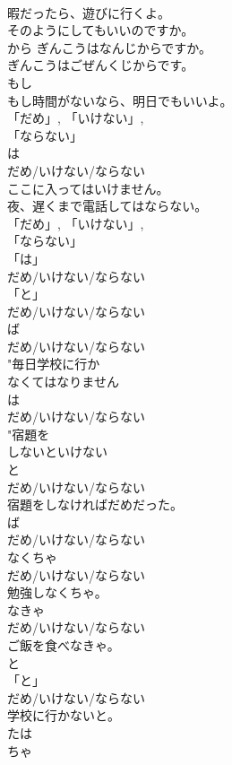 \documentclass[8pt]{extreport}
\begin{document}
\begin{CJK}{UTF8}{min}
\\	暇だったら、遊びに行くよ。
\\	そのようにしてもいいのですか。
\\	から	ぎんこうはなんじからですか。 
\\	ぎんこうはごぜんくじからです。 
\\	もし　	
\\	もし時間がないなら、明⽇でもいいよ。 
\\	「だめ」, 「いけない」, 
\\	「ならない」	
\\	は
\\	だめ/いけない/ならない 
\\	ここに入ってはいけません。 
\\	夜、遅くまで電話してはならない。 
\\	「だめ」, 「いけない」, 
\\	「ならない」
\\	「は」 
\\	だめ/いけない/ならない 
\\	「と」 
\\	だめ/いけない/ならない 
\\	ば 
\\	だめ/いけない/ならない 
\\	"毎日学校に行か
\\	なくてはなりません
\\	は 
\\	だめ/いけない/ならない 
\\	"宿題を
\\	しないといけない
\\	と 
\\	だめ/いけない/ならない 
\\	宿題をしなければだめだった。	
\\	ば 
\\	だめ/いけない/ならない 
\\	なくちゃ	
\\	だめ/いけない/ならない  
\\	勉強しなくちゃ。
\\	なきゃ	
\\	だめ/いけない/ならない 
\\	ご飯を食べなきゃ。 
\\	と  
\\	「と」 
\\	だめ/いけない/ならない 
\\	学校に行かないと。 
\\	たは 
\\	ちゃ	

\end{CJK}
\end{document}

